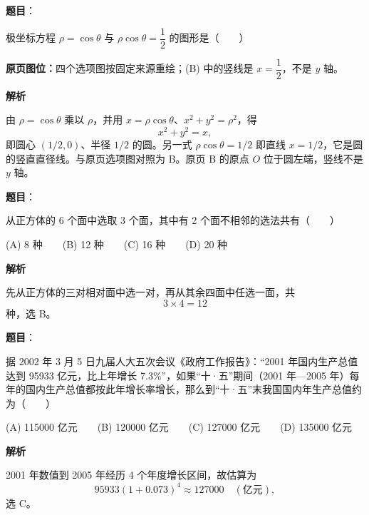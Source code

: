 \begin{answer}

\textbf{题目}：

极坐标方程 $\rho=\cos\theta$ 与 $\rho\cos\theta=\dfrac12$ 的图形是\mbox{（　　）}

\textbf{原页图位：}四个选项图按固定来源重绘；(B) 中的竖线是 $x=\dfrac12$，不是 $y$ 轴。
\nopagebreak[4]
\begin{center}\end{center}
\nopagebreak[4]
\textbf{解析}

由 $\rho=\cos\theta$ 乘以 $\rho$，并用 $x=\rho\cos\theta$、$x^2+y^2=\rho^2$，得
\nopagebreak[4]
\[
x^2+y^2=x,
\]
即圆心 $(1/2,0)$、半径 $1/2$ 的圆。另一式 $\rho\cos\theta=1/2$ 即直线 $x=1/2$，它是圆的竖直直径线。与原页选项图对照为 B。原页 B 的原点 $O$ 位于圆左端，竖线不是 $y$ 轴。


\end{answer}
\begin{answer}

\textbf{题目}：

从正方体的 6 个面中选取 3 个面，其中有 2 个面不相邻的选法共有\mbox{（　　）}

(A) 8 种　　(B) 12 种　　(C) 16 种　　(D) 20 种

\textbf{解析}

先从正方体的三对相对面中选一对，再从其余四面中任选一面，共
\nopagebreak[4]
\[
3\times4=12
\]
种，选 B。


\end{answer}
\begin{answer}

\textbf{题目}：

据 2002 年 3 月 5 日九届人大五次会议《政府工作报告》：“2001 年国内生产总值达到 95933 亿元，比上年增长 7.3\%”，如果“十·五”期间（2001 年—2005 年）每年的国内生产总值都按此年增长率增长，那么到“十·五”末我国国内年生产总值约为\mbox{（　　）}

(A) 115000 亿元　　(B) 120000 亿元　　(C) 127000 亿元　　(D) 135000 亿元

\textbf{解析}

2001 年数值到 2005 年经历 4 个年度增长区间，故估算为
\nopagebreak[4]
\[
95933(1+0.073)^4\approx127000\quad(\text{亿元}),
\]
选 C。


\end{answer}

